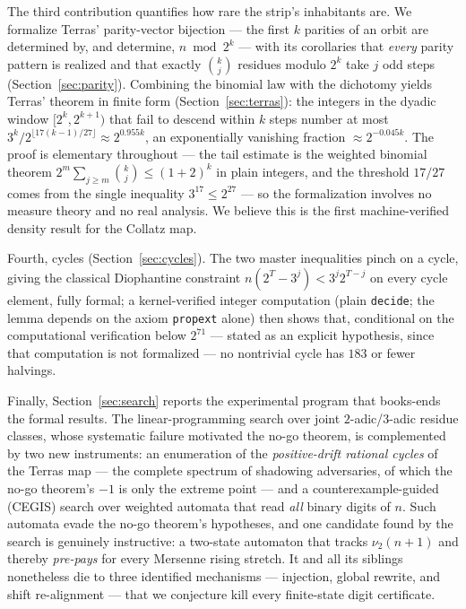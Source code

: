 \documentclass[11pt]{article}
\newcommand{\code}[1]{\texttt{#1}}
\begin{document}
The third contribution quantifies how rare the strip's inhabitants are.
We formalize Terras' parity-vector bijection --- the first $k$
parities of an orbit are determined by, and determine, $n \bmod 2^k$
--- with its corollaries that \emph{every} parity pattern is realized
and that exactly $\binom{k}{j}$ residues modulo $2^k$ take $j$ odd
steps (Section~\ref{sec:parity}). Combining the binomial law with the
dichotomy yields Terras' theorem \cite{terras} in finite form
(Section~\ref{sec:terras}): the integers in the dyadic window
$[2^k, 2^{k+1})$ that fail to descend within $k$ steps number at most
$3^k / 2^{\lfloor 17(k-1)/27 \rfloor} \approx 2^{0.955k}$, an
exponentially vanishing fraction $\approx 2^{-0.045k}$. The proof is
elementary throughout --- the tail estimate is the weighted binomial
theorem $2^m \sum_{j \ge m} \binom{k}{j} \le (1+2)^k$ in plain
integers, and the threshold $17/27$ comes from the single inequality
$3^{17} \le 2^{27}$ --- so the formalization involves no measure
theory and no real analysis. We believe this is the first
machine-verified density result for the Collatz map.

Fourth, cycles (Section~\ref{sec:cycles}). The two master inequalities
pinch on a cycle, giving the classical Diophantine constraint
$n(2^T - 3^j) < 3^j 2^{T-j}$ on every cycle element, fully formal; a
kernel-verified integer computation (plain \code{decide}; the lemma
depends on the axiom \code{propext} alone) then shows that,
conditional on the computational verification below $2^{71}$ ---
stated as an explicit hypothesis, since that computation is not
formalized --- no nontrivial cycle has $183$ or fewer halvings.

Finally, Section~\ref{sec:search} reports the experimental program
that books-ends the formal results. The linear-programming search over
joint $2$-adic/$3$-adic residue classes, whose systematic failure
motivated the no-go theorem, is complemented by two new instruments:
an enumeration of the \emph{positive-drift rational cycles} of the
Terras map --- the complete spectrum of shadowing adversaries, of
which the no-go theorem's $-1$ is only the extreme point --- and a
counterexample-guided (CEGIS) search over weighted automata that read
\emph{all} binary digits of $n$. Such automata evade the no-go
theorem's hypotheses, and one candidate found by the search is
genuinely instructive: a two-state automaton that tracks
$\nu_2(n+1)$ and thereby \emph{pre-pays} for every Mersenne rising
stretch. It and all its siblings nonetheless die to three identified
mechanisms --- injection, global rewrite, and shift re-alignment ---
that we conjecture kill every finite-state digit certificate.
\end{document}
